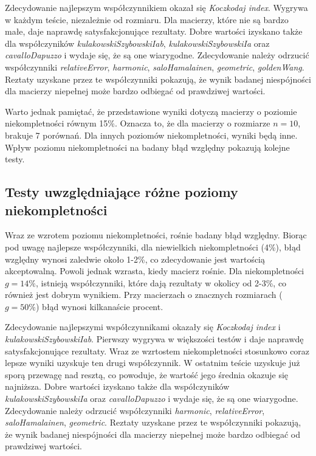 Zdecydowanie najlepszym współczynnikiem okazał się \textit{Koczkodaj index}. Wygrywa w każdym teście, niezależnie od rozmiaru. Dla macierzy, które nie są bardzo małe, daje naprawdę satysfakcjonujące rezultaty. Dobre wartości izyskano także dla współczyników \textit{kulakowskiSzybowskiIab}, \textit{kulakowskiSzybowskiIa} oraz \textit{cavalloDapuzzo} i wydaje się, że są one wiarygodne. Zdecydowanie należy odrzucić współczynniki \textit{relativeError}, \textit{harmonic}, \textit{saloHamalainen}, \textit{geometric}, \textit{goldenWang}. Reztaty uzyskane przez te współczynniki pokazują, że wynik badanej niespójności dla macierzy niepełnej może bardzo odbiegać od prawdziwej wartości.

Warto jednak pamiętać, że przedstawione wyniki dotyczą macierzy o poziomie niekompletności równym 15\%. Oznacza to, że dla macierzy o rozmiarze $n=10$, brakuje 7 porównań. Dla innych poziomów niekompletności, wyniki będą inne. Wpływ poziomu niekompletności na badany błąd względny pokazują kolejne testy.

\subsection{Testy uwzględniające różne poziomy niekompletności}
Wraz ze wzrotem poziomu niekompletności, rośnie badany błąd względny. Biorąc pod uwagę najlepsze współczynniki, dla niewielkich niekompletności (4\%), błąd względny wynosi zaledwie około 1-2\%, co zdecydowanie jest wartością akceptowalną. Powoli jednak wzrasta, kiedy macierz rośnie. Dla niekompletności $g=14\%$, istnieją współczynniki, które dają rezultaty w okolicy od 2-3\%, co również jest dobrym wynikiem. Przy macierzach o znacznych rozmiarach ($g=50\%$) błąd wynosi kilkanaście procent.

Zdecydowanie najlepszymi współczynnikami okazały się \textit{Koczkodaj index} i \textit{kulakowskiSzybowskiIab}. Pierwszy wygrywa w większości testów i daje naprawdę satysfakcjonujące rezultaty. Wraz ze wzrtostem niekompletności stosunkowo coraz lepsze wyniki uzyskuje ten drugi współczynnik. W ostatnim teście uzyskuje już sporą przewagę nad resztą, co powoduje, że wartość jego średnia okazuje się najniższa. Dobre wartości izyskano także dla współczyników \textit{kulakowskiSzybowskiIa} oraz \textit{cavalloDapuzzo} i wydaje się, że są one wiarygodne. Zdecydowanie należy odrzucić współczynniki \textit{harmonic}, \textit{relativeError}, \textit{saloHamalainen}, \textit{geometric}. Reztaty uzyskane przez te współczynniki pokazują, że wynik badanej niespójności dla macierzy niepełnej może bardzo odbiegać od prawdziwej wartości.

